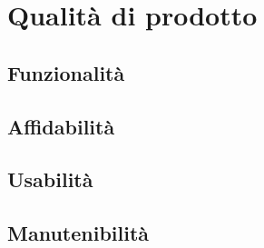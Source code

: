 \section{Qualità di prodotto}
\subsection{Funzionalità}
\subsection{Affidabilità}
\subsection{Usabilità}
\subsection{Manutenibilità}